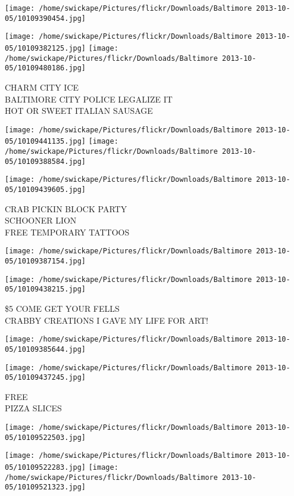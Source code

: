 \documentclass[10pt,letterpaper]{article}
\begin{document}
\texttt{[image: /home/swickape/Pictures/flickr/Downloads/Baltimore 2013-10-05/10109390454.jpg]}

\vspace{0.25in}
\texttt{[image: /home/swickape/Pictures/flickr/Downloads/Baltimore 2013-10-05/10109382125.jpg]}
\texttt{[image: /home/swickape/Pictures/flickr/Downloads/Baltimore 2013-10-05/10109480186.jpg]}

CHARM CITY ICE\\
BALTIMORE CITY POLICE LEGALIZE IT\\
HOT OR SWEET ITALIAN SAUSAGE
\pagebreak

\texttt{[image: /home/swickape/Pictures/flickr/Downloads/Baltimore 2013-10-05/10109441135.jpg]}
\texttt{[image: /home/swickape/Pictures/flickr/Downloads/Baltimore 2013-10-05/10109388584.jpg]}

\texttt{[image: /home/swickape/Pictures/flickr/Downloads/Baltimore 2013-10-05/10109439605.jpg]}

CRAB PICKIN BLOCK PARTY\\
SCHOONER LION\\
FREE TEMPORARY TATTOOS
\pagebreak

\texttt{[image: /home/swickape/Pictures/flickr/Downloads/Baltimore 2013-10-05/10109387154.jpg]}

\vspace{0.25in}
\texttt{[image: /home/swickape/Pictures/flickr/Downloads/Baltimore 2013-10-05/10109438215.jpg]}

\$5 COME GET YOUR FELLS\\
CRABBY CREATIONS I GAVE MY LIFE FOR ART!
\pagebreak

\texttt{[image: /home/swickape/Pictures/flickr/Downloads/Baltimore 2013-10-05/10109385644.jpg]}

\vspace{0.25in}
\texttt{[image: /home/swickape/Pictures/flickr/Downloads/Baltimore 2013-10-05/10109437245.jpg]}

FREE\\
PIZZA SLICES
\pagebreak

\texttt{[image: /home/swickape/Pictures/flickr/Downloads/Baltimore 2013-10-05/10109522503.jpg]}

\vspace{0.25in}
\texttt{[image: /home/swickape/Pictures/flickr/Downloads/Baltimore 2013-10-05/10109522283.jpg]}
\texttt{[image: /home/swickape/Pictures/flickr/Downloads/Baltimore 2013-10-05/10109521323.jpg]}
\end{document}
